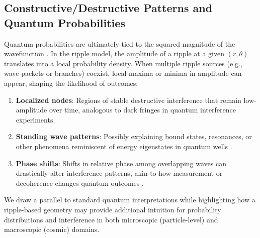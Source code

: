 \documentclass{article}
\begin{document}
\subsection{Constructive/Destructive Patterns and Quantum Probabilities}
\label{subsec:constructive-destructive}
Quantum probabilities are ultimately tied to the squared magnitude of the wavefunction 
\cite{feynmanlectures, vonneumann1932}. In the ripple model, the amplitude of a ripple 
at a given \((r,\theta)\) translates into a local probability density. When multiple 
ripple sources (e.g., wave packets or branches) coexist, local maxima or minima in 
amplitude can appear, shaping the likelihood of outcomes:
\begin{enumerate}
  \item \textbf{Localized nodes}: Regions of stable destructive interference 
        that remain low-amplitude over time, analogous to dark fringes in 
        quantum interference experiments.
  \item \textbf{Standing wave patterns}: Possibly explaining bound states, 
        resonances, or other phenomena reminiscent of energy eigenstates in 
        quantum wells \cite{griffiths2005introduction}.
  \item \textbf{Phase shifts}: Shifts in relative phase among overlapping waves 
        can drastically alter interference patterns, akin to how measurement 
        or decoherence changes quantum outcomes \cite{Bell1964, nielsenchuang2000}.
\end{enumerate}
We draw a parallel to standard quantum interpretations while highlighting how 
a ripple-based geometry may provide additional intuition for probability 
distributions and interference in both microscopic (particle-level) and 
macroscopic (cosmic) domains.
\end{document}
